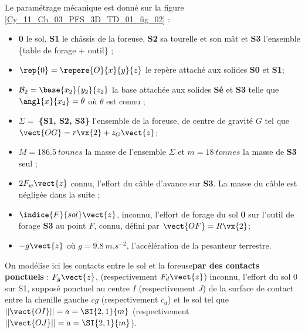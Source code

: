 Le paramétrage mécanique est donné sur la figure \ref{Cy_11_Ch_03_PFS_3D_TD_01_fig_02} : 
\begin{itemize}
\item \textbf{0} le sol, \textbf{S1} le châssis de la foreuse, \textbf{S2} sa tourelle et son mât et \textbf{S3} l’ensemble \{table de forage + outil\} ; 
\item $\rep{0} = \repere{O}{x}{y}{z}$ le repère attaché aux solides \textbf{S0} et \textbf{S1}; 
\item $\mathcal{B}_2=\base{x_2}{y_2}{z_2}$ la base attachée aux solides \textbf{Sé} et \textbf{S3} telle que $\angl{x}{x_2}=\theta$ où $\theta$ est connu ;
\item $\Sigma = $ \textbf{\{S1, S2, S3\}} l’ensemble de la foreuse, de centre de gravité $G$ tel que $\vect{OG} = r \vx{2} +  z_G \vect{z}$;
\item $M = \SI{186,5}{tonnes}$ la masse de l’ensemble $\Sigma$ et $m =\SI{18}{tonnes}$ la masse de \textbf{S3} seul ; 
\item $2F_w \vect{z}$ connu, l’effort du câble d’avance sur \textbf{S3}. La masse du câble est négligée dans la suite ; 
\item $\indice{F}{sol}\vect{z}$, inconnu, l’effort de forage du sol \textbf{0} sur l’outil de forage \textbf{S3} au point $F$, connu, défini par $\vect{OF}=R\vx{2}$;
\item $-g\vect{z}$  où $g = \SI{9,8}{m.s^{-2}}$, l’accélération de la pesanteur terrestre.
\end{itemize}

On modélise ici les contacts entre le sol et la foreuse\textbf{par des contacts ponctuels}  :
$F_g \vect{z}$, (respectivement  $F_d \vect{z}$) inconnu, l’effort du sol 0 sur S1, supposé ponctuel au centre $I$ (respectivement  $J$) de la surface de contact entre la chenille gauche $cg$ (respectivement  $c_d$) et le sol tel que $||\vect{OI}|| = a=\SI{2,1}{m}$ (respectivement  $||\vect{OJ}|| = a=\SI{2,1}{m}$).


